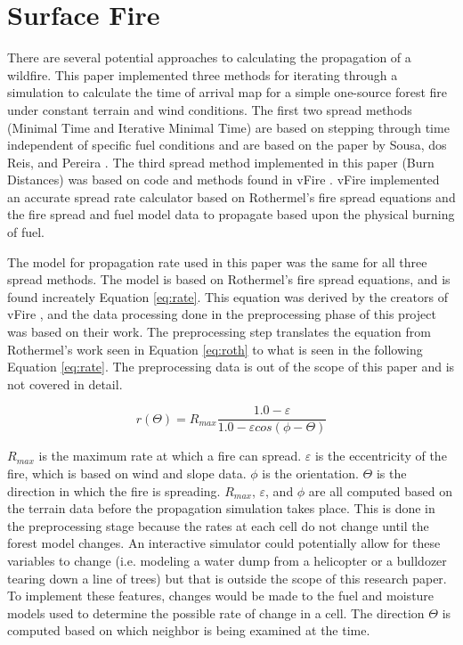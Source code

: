 \section{Surface Fire}
There are several potential approaches to calculating the propagation of a wildfire. This paper implemented three methods for iterating through a simulation to calculate the time of arrival map for a simple one-source forest fire under constant terrain and wind conditions. The first two spread methods (Minimal Time and Iterative Minimal Time) are based on stepping through time independent of specific fuel conditions and are based on the paper by Sousa, dos Reis, and Pereira \cite{gpufire}. The third spread method implemented in this paper (Burn Distances) was based on code and methods found in vFire \cite{vFire}. vFire implemented an accurate spread rate calculator based on Rothermel's fire spread equations and the fire spread and fuel model data to propagate based upon the physical burning of fuel.

The model for propagation rate used in this paper was the same for all three spread methods. The model is based on Rothermel's fire spread equations, and is found increately Equation \ref{eq:rate}. This equation was derived by the creators of vFire \cite{vFire}, and the data processing done in the preprocessing phase of this project was based on their work. The preprocessing step translates the equation from Rothermel's work seen in Equation \ref{eq:roth} to what is seen in the following Equation \ref{eq:rate}. The preprocessing data is out of the scope of this paper and is not covered in detail. 

\begin{equation}
r(\Theta ) = R_{max}\frac{1.0 - \varepsilon }{1.0 - \varepsilon cos(\phi-\Theta )}
\label{eq:rate}
\end{equation}

$R_{max}$ is the maximum rate at which a fire can spread. $\varepsilon$ is the eccentricity of the fire, which is based on wind and slope data. $\phi$ is the orientation. $\Theta$ is the direction in which the fire is spreading. $R_{max}$, $\varepsilon$, and $\phi$ are all computed based on the terrain data before the propagation simulation takes place. This is done in the preprocessing stage because the rates at each cell do not change until the forest model changes. An interactive simulator could potentially allow for these variables to change (i.e. modeling a water dump from a helicopter or a bulldozer tearing down a line of trees) but that is outside the scope of this research paper. To implement these features, changes would be made to the fuel and moisture models used to determine the possible rate of change in a cell. The direction $\Theta$ is computed based on which neighbor is being examined at the time. 

